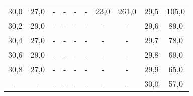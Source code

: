 \begin{table}[htp]
\begin{center}
\begin{tabular}{cc|cc|cc|cc|cc}
                        30,0 & 27,0 & - & - & - & - & 23,0 & 261,0 & 29,5 & 105,0\\
                        30,2 & 29,0 & - & - & - & - & - & - & 29,6 & 89,0\\
                        30,4 & 27,0 & - & - & - & - & - & - & 29,7 & 78,0\\
                        30,6 & 29,0 & - & - & - & - & - & - & 29,8 & 69,0\\
                        30,8 & 27,0 & - & - & - & - & - & - & 29,9 & 65,0\\
                        - & - & - & - & - &  - & - & - & 30,0 & 57,0\\
                \bottomrule
                \end{tabular}
        \end{center}
\end{table}
